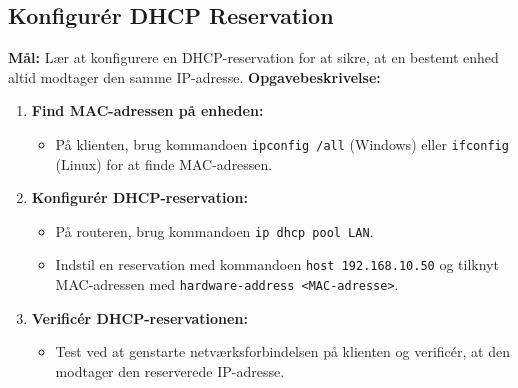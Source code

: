 \subsection{Konfigurér DHCP Reservation}
\textbf{Mål:} Lær at konfigurere en DHCP-reservation for at sikre, at en bestemt enhed altid modtager den samme IP-adresse.
\newline\newline\noindent
\textbf{Opgavebeskrivelse:}
\begin{enumerate}
	\item \textbf{Find MAC-adressen på enheden:}
	\begin{itemize}
		\item På klienten, brug kommandoen \texttt{ipconfig /all} (Windows) eller \texttt{ifconfig} (Linux) for at finde MAC-adressen.
	\end{itemize}
	\item \textbf{Konfigurér DHCP-reservation:}
	\begin{itemize}
		\item På routeren, brug kommandoen \texttt{ip dhcp pool LAN}.
		\item Indstil en reservation med kommandoen \texttt{host 192.168.10.50} og tilknyt MAC-adressen med \texttt{hardware-address <MAC-adresse>}.
	\end{itemize}
	\item \textbf{Verificér DHCP-reservationen:}
	\begin{itemize}
		\item Test ved at genstarte netværksforbindelsen på klienten og verificér, at den modtager den reserverede IP-adresse.
	\end{itemize}
\end{enumerate}

